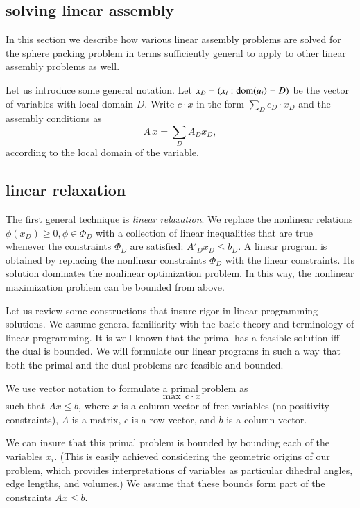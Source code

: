 \subsection{solving linear assembly}

In this section we describe how various linear assembly problems
are solved for the sphere packing problem in terms
sufficiently general to apply to other linear assembly problems as
well.

Let us introduce some general notation.  Let $x_D = (x_i:
{\operatorname{dom}}(u_i)=D)$ be the vector of variables with local domain
$D$. Write $c\cdot x$ in the form $\sum_D c_D\cdot x_D$ and the
assembly conditions as
$$A \,x =\sum_D A_D x_D,$$
according to the local domain of the variable.


\subsection{linear relaxation}
The first general technique is {\it linear relaxation}. We replace
the nonlinear relations $\phi(x_D)\ge0, \phi\in\Phi_D$ with a
collection of linear inequalities that are true whenever the
constraints $\Phi_D$ are satisfied: $A'_D x_D \le b_D$.  A linear
program is obtained by replacing the nonlinear constraints
$\Phi_D$ with the linear constraints. Its solution dominates the
nonlinear optimization problem.  In this way, the nonlinear
maximization problem can be bounded from above.

Let us review some constructions that insure rigor in linear
programming solutions. We assume general familiarity with the
basic theory and terminology of linear programming. It is
well-known that the primal has a feasible solution iff the dual is
bounded.  We will formulate our linear programs in such a way that
both the primal and the dual problems are feasible and bounded.

We use vector notation to formulate a primal problem as
    \begin{equation}
        \max\, c\cdot x
        \label{cx}
    \end{equation}
such that $A x \le b$, where $x$ is a column vector of free
variables (no positivity constraints), $A$ is a matrix, $c$ is a
row vector, and $b$ is a column vector.

We can insure that this primal problem is bounded by bounding each
of the variables $x_i$.  (This is easily achieved considering the
geometric origins of our problem, which provides interpretations
of variables as particular dihedral angles, edge lengths, and
volumes.) We assume that these bounds form part of the constraints
$A x\le b$.

